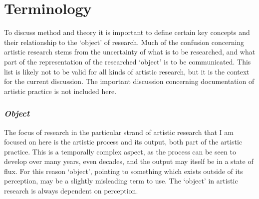 \documentclass[12pt]{article}
\begin{document}
\section*{Terminology}

To discuss method and theory it is important to define certain key concepts and their relationship to the `object' of research. Much of the confusion concerning artistic research stems from the uncertainty of what is to be researched, and what part of the representation of the researched `object' is to be communicated. This list is likely not to be valid for all kinds of artistic research, but it is the context for the current discussion. The important discussion concerning documentation of artistic practice is not included here.

 
\subsubsection*{\emph{Object}}

The focus of research in the particular strand of artistic research that I am focused on here is the artistic process and its output, both part of the artistic practice. This is a temporally complex aspect, as the process can be seen to develop over many years, even decades, and the output may itself be in a state of flux. For this reason `object', pointing to something which exists outside of its perception, may be a slightly misleading term to use. The `object' in artistic research is always dependent on perception.

\end{document}
